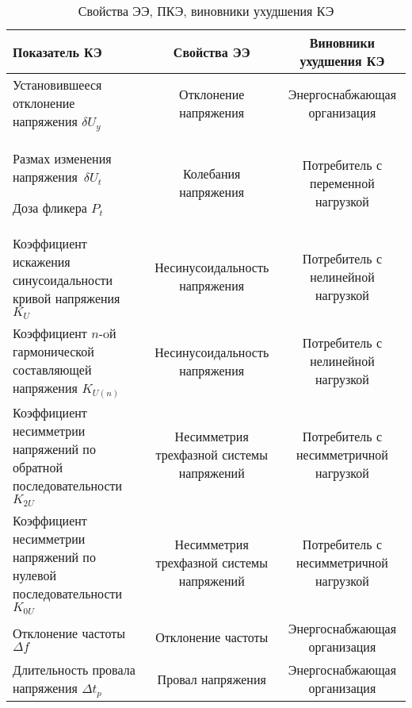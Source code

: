 \begin{table} [p]%
	\caption{Свойства ЭЭ, ПКЭ, виновники ухудшения КЭ}%
	\label{tbl:test3}%
	\begin{SingleSpace}
		\setlength\extrarowheight{6pt} %
		\setlength{\tymin}{1.9cm}%
		\begin{tabulary}{\textwidth}{@{}>{\zz}L >{\zz}C >{\zz}C @{}}%
			\toprule     %
			Показатель КЭ & 
			Свойства ЭЭ &
			Виновники ухудшения КЭ \\
			\midrule %
			Установившееся отклонение напряжения ${\delta U_y}$ &
			Отклонение напряжения &
			Энергоснабжающая организация \\
			
			Размах изменения напряжения~${\delta U_t}$ 
			
			Доза фликера ${P_t}$ &
			Колебания напряжения &
			Потребитель с переменной нагрузкой \\
			
			Коэффициент искажения синусоидальности кривой напряжения ${K_U}$ &
			Несинусоидальность напряжения &
			Потребитель с нелинейной нагрузкой \\
			
			Коэффициент $n$-oй гармонической составляющей напряжения ${K_{U(n)}}$ &
			Несинусоидальность напряжения &
			Потребитель с нелинейной нагрузкой \\
			
			Коэффициент несимметрии напряжений по обратной последовательности ${K_{2U}}$ &
			Несимметрия трехфазной системы напряжений &
			Потребитель с несимметричной нагрузкой \\
			
			Коэффициент несимметрии напряжений по нулевой последовательности ${K_{0U}}$ &
			Несимметрия трехфазной системы напряжений &
			Потребитель с несимметричной нагрузкой \\
			
			Отклонение частоты ${\Delta f}$ &
			Отклонение частоты &
			Энергоснабжающая организация \\
			
			Длительность провала напряжения ${\Delta t_p}$ & %
			Провал напряжения &
			Энергоснабжающая организация \\
			

\end{tabulary}
\end{SingleSpace}
\end{table}

